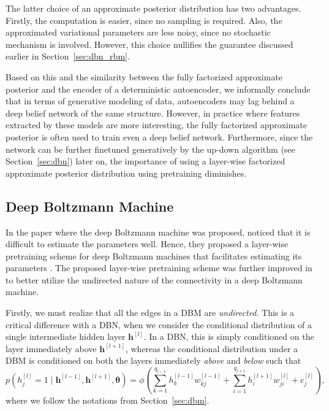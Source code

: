 \documentclass[dissertation,nocontribution]{aaltoseries}
\newcommand{\qlay}[1]{\left[#1\right]}
\newcommand{\vect}[1]{\mathbf{#1}}
\newcommand{\vects}[1]{\boldsymbol{#1}}
\newcommand{\vh}[0]{\vect{h}}
\newcommand{\TT}[0]{{\vects{\theta}}}
\begin{document}
The latter choice of an approximate posterior distribution has
two advantages. Firstly, the computation is easier, since no
sampling is required. Also, the approximated variational
parameters are less noisy, since no stochastic mechanism is
involved. However, this choice nullifies the guarantee discussed
earlier in Section~\ref{sec:dbn_rbm}.

Based on this and the similarity between the fully
factorized approximate posterior and the encoder of a
deterministic autoencoder, we informally conclude that in
terms of generative modeling of data, autoencoders may lag
behind a deep belief network of the same structure. However,
in practice where features extracted by these models are
more interesting, the fully factorized approximate posterior
is often used to train even a deep belief network.
Furthermore, since the network can be further finetuned
generatively by the up-down algorithm (see
Section~\ref{sec:dbn}) later on, the importance of using a
layer-wise factorized approximate posterior distribution
using pretraining diminishes.



\subsection{Deep Boltzmann Machine}
\label{sec:dbm_pre}

In the paper where the deep Boltzmann machine was proposed,
\citet{Salakhutdinov2009a} noticed that it is difficult to
estimate the parameters well. Hence, they proposed a
layer-wise pretraining scheme for deep Boltzmann machines
that facilitates estimating its parameters
\citep{Salakhutdinov2012nc}. The proposed layer-wise
pretraining scheme was further improved in
\citep{Salakhutdinov2012} to better utilize the undirected
nature of the connectivity in a deep Boltzmann machine.

Firstly, we must realize that all the edges in a DBM are
\textit{undirected}. This is a critical difference with a
DBN, when we consider the conditional distribution of a
single intermediate hidden layer $\vh^{\qlay{l}}$. In a DBN, this
is simply conditioned on the layer immediately above
$\vh^{\qlay{l+1}}$, whereas the conditional distribution under a
DBM is conditioned on both the layers immediately
\textit{above} and \textit{below} such that
\[
p(h^{\qlay{l}}_j = 1 \mid \vh^{\qlay{l-1}}, \vh^{\qlay{l+1}}, \TT) = \phi\left(
\sum_{k=1}^{q_{l-1}} h^{\qlay{l-1}}_k w_{kj}^{\qlay{l-1}} +
\sum_{i=1}^{q_{l+1}} h^{\qlay{l+1}}_i w_{ji}^{\qlay{l}} +
c_j^{\qlay{l}}
\right),
\]
where we follow the notations from Section~\ref{sec:dbm}.
\end{document}
